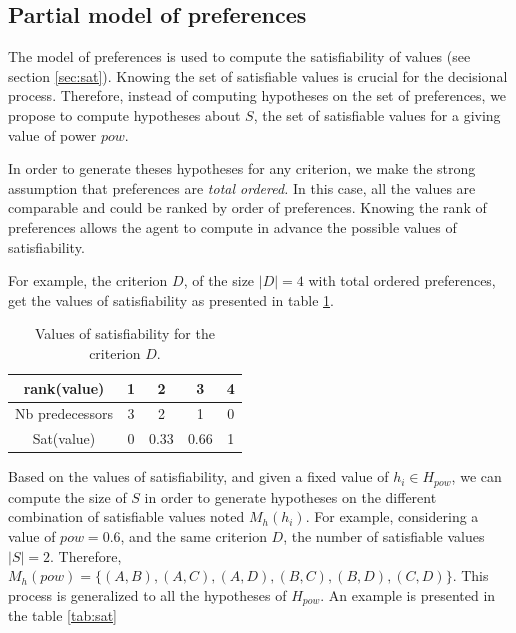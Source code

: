 \documentclass[conference, letterpaper]{IEEEtran}
\begin{document}
\subsection{Partial model of preferences}

The model of preferences is used to compute the satisfiability of values (see section \ref{sec:sat}). Knowing the set of satisfiable values is crucial for the decisional process. Therefore, instead of computing hypotheses on the set of preferences, we propose to compute hypotheses about $S$, the set of satisfiable values for a giving value of power $pow$.  

\par In order to generate theses hypotheses for any criterion, we make the strong assumption that preferences are \emph{total ordered.} In this case, all the values are comparable and could be ranked by order of preferences. Knowing the rank of preferences allows the agent to compute in advance the possible values of satisfiability.

For example, the criterion $D$, of the size  $|D| = 4$ with total ordered preferences, get the values of satisfiability as presented in table \ref{tab:poss}.
\begin{table}[h]
	\centering
	\begin{tabular}{ |c|c|c|c|c| }
		\hline				
		rank(value) & 1 & 2 & 3 & 4 \\
		\hline
		Nb predecessors & 3 & 2 & 1& 0 \\
		\hline
		Sat(value) & 0 & 0.33 & 0.66 &1 \\
		\hline
		
	\end{tabular}
	\caption{Values of satisfiability for the criterion $D$.}
	\label{tab:poss}
\end{table}

Based on the values of satisfiability, and given a fixed value of $h_i \in H_{pow}$, we can compute the size of $S$ in order to generate hypotheses on the different combination of satisfiable values  noted $M_h(h_i)$. For example, considering a value of $pow =0.6$, and the same criterion $D$, the number of satisfiable values $|S| = 2$. Therefore, $M_h(pow) = \{(A,B), (A,C), (A,D), (B,C), (B,D), (C,D)\}$. This process is generalized to all the hypotheses of $H_{pow}$. An example is presented in the table \ref{tab:sat}
\end{document}

